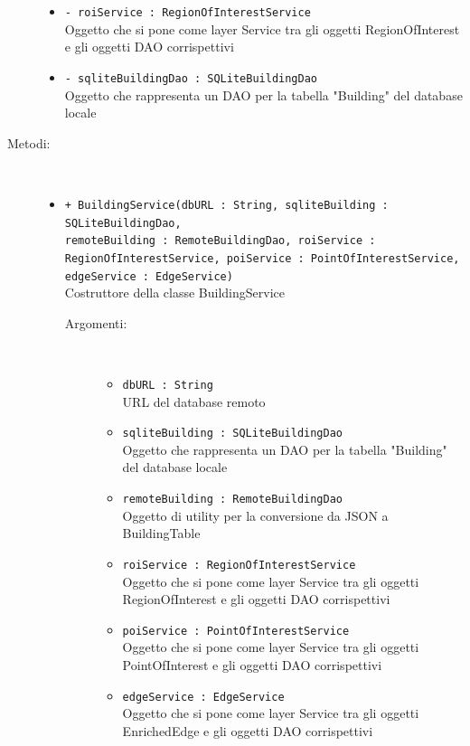 \documentclass[../DefinizioneDiProdotto.tex]{subfiles}
\begin{document}
\begin{description}
\begin{itemize}
		\item \texttt{- roiService : RegionOfInterestService}\\
		Oggetto che si pone come layer Service tra gli oggetti RegionOfInterest e gli oggetti DAO corrispettivi
		
		\item \texttt{- sqliteBuildingDao : SQLiteBuildingDao}\\
		Oggetto che rappresenta un DAO per la tabella "Building" del database locale
		
	\end{itemize}
	\item[Metodi:] \
	\begin{itemize}
		\item \texttt{+ BuildingService(dbURL : String, sqliteBuilding : SQLiteBuildingDao,\\ remoteBuilding : RemoteBuildingDao, roiService : \\ RegionOfInterestService, poiService : PointOfInterestService, \\ edgeService : EdgeService)}\\
		Costruttore della classe BuildingService
		\begin{description}
			\item[Argomenti:] \
			\begin{itemize}
				\item \texttt{dbURL : String}\\
				URL del database remoto\item \texttt{sqliteBuilding : SQLiteBuildingDao}\\
				Oggetto che rappresenta un DAO per la tabella "Building" del database locale\item \texttt{remoteBuilding : RemoteBuildingDao}\\
				Oggetto di utility per la conversione da JSON a BuildingTable\item \texttt{roiService : RegionOfInterestService}\\
				Oggetto che si pone come layer Service tra gli oggetti RegionOfInterest e gli oggetti DAO corrispettivi\item \texttt{poiService : PointOfInterestService}\\
				Oggetto che si pone come layer Service tra gli oggetti PointOfInterest e gli oggetti DAO corrispettivi\item \texttt{edgeService : EdgeService}\\
				Oggetto che si pone come layer Service tra gli oggetti EnrichedEdge e gli oggetti DAO corrispettivi\end{itemize}

\end{description}
\end{itemize}
\end{description}
\end{document}
